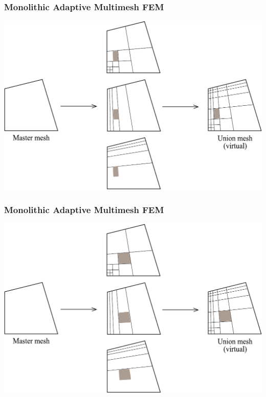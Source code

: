 \begin{frame}
  \frametitle{Monolithic Adaptive Multimesh FEM}
  \begin{center}
    \includegraphics[height=0.7\textheight]{multimesh/mm_12.pdf}
  \end{center}
\end{frame}

\begin{frame}
  \frametitle{Monolithic Adaptive Multimesh FEM}
  \begin{center}
    \includegraphics[height=0.7\textheight]{multimesh/mm_13.pdf}
  \end{center}
\end{frame}

